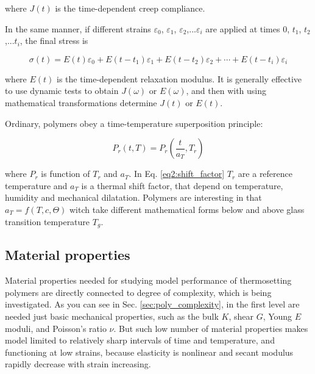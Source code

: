 \begin{itemize}
	where $J(t)$ is the time-dependent creep compliance.
	
	In the same manner, if different strains $\varepsilon_{0}$, $\varepsilon_{1}$, $\varepsilon_{2}$,...$\varepsilon_{i}$ are applied at times $0$, $t_{1}$, $t_{2}$,...$t_{i}$, the final stress is 
	
	\begin{equation}\label{eq2:boltzmann_sig}
	\sigma(t) = E(t)\varepsilon_{0} + E(t-t_{1})\varepsilon_{1}+ E(t-t_{2})\varepsilon_{2}+\cdots+E(t-t_{i})\varepsilon_{i}
	\end{equation}
	
	where $E(t)$ is the time-dependent relaxation modulus. It is generally effective to use dynamic tests to obtain $J(\omega)$ or $E(\omega)$, and then with using mathematical transformations determine $J(t)$ or $E(t)$.
	
	Ordinary, polymers obey a time-temperature superposition principle:
	
	\begin{equation}\label{eq2:shift_factor}
		P_{r}(t,T) = P_{r} \left(\dfrac{t}{a_{T}}, T_{r}\right)
	\end{equation}
	
	where $P_{r}$ is function of $T_{r}$ and $a_{T}$. In Eq. \ref{eq2:shift_factor} $T_{r}$ are a reference temperature and $a_{T}$ is a thermal shift factor, that depend on temperature, humidity and mechanical dilatation. Polymers are interesting in that $a_{T} = f(T, c, \Theta)$ witch take different mathematical forms below and above glass transition temperature $T_{g}$.
	
\end{itemize}


\subsection{Material properties}\label{subsec:mat_proper}
\indent

Material properties needed for studying model performance of thermosetting polymers are directly connected to degree of complexity, which is being investigated. As you can see in Sec. \ref{sec:poly_complexity}, in the first level are needed just basic mechanical properties, such as the bulk $K$, shear $G$, Young $E$ moduli, and Poisson's ratio $\nu$. But such low number of material properties makes model limited to relatively sharp intervals of time and temperature, and functioning at low strains, because elasticity is nonlinear and secant modulus rapidly decrease with strain increasing. 

